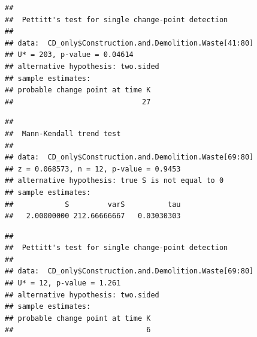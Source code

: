 \documentclass[12pt,]{article}
\newenvironment{Shaded}{\begin{snugshade}}{\end{snugshade}}
\newcommand{\KeywordTok}[1]{\textcolor[rgb]{0.13,0.29,0.53}{\textbf{#1}}}
\newcommand{\DecValTok}[1]{\textcolor[rgb]{0.00,0.00,0.81}{#1}}
\newcommand{\StringTok}[1]{\textcolor[rgb]{0.31,0.60,0.02}{#1}}
\newcommand{\CommentTok}[1]{\textcolor[rgb]{0.56,0.35,0.01}{\textit{#1}}}
\newcommand{\OperatorTok}[1]{\textcolor[rgb]{0.81,0.36,0.00}{\textbf{#1}}}
\newcommand{\NormalTok}[1]{#1}
\begin{document}
\begin{verbatim}
## 
##  Pettitt's test for single change-point detection
## 
## data:  CD_only$Construction.and.Demolition.Waste[41:80]
## U* = 203, p-value = 0.04614
## alternative hypothesis: two.sided
## sample estimates:
## probable change point at time K 
##                              27
\end{verbatim}

\begin{Shaded}
\end{Shaded}

\begin{verbatim}
## 
##  Mann-Kendall trend test
## 
## data:  CD_only$Construction.and.Demolition.Waste[69:80]
## z = 0.068573, n = 12, p-value = 0.9453
## alternative hypothesis: true S is not equal to 0
## sample estimates:
##            S         varS          tau 
##   2.00000000 212.66666667   0.03030303
\end{verbatim}

\begin{Shaded}
\end{Shaded}

\begin{verbatim}
## 
##  Pettitt's test for single change-point detection
## 
## data:  CD_only$Construction.and.Demolition.Waste[69:80]
## U* = 12, p-value = 1.261
## alternative hypothesis: two.sided
## sample estimates:
## probable change point at time K 
##                               6
\end{verbatim}

\begin{Shaded}
\end{Shaded}
\end{document}
